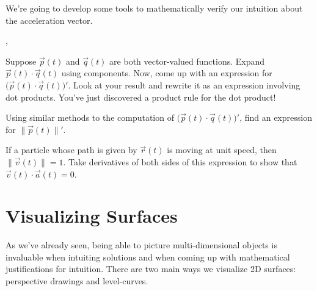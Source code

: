 \documentclass[letter]{article}
\renewcommand{\emph}[1]{{\color{defcolor} \textbf{\textit{##1}}}}
\begin{document}
	We're going to develop some tools to mathematically verify our intuition about the acceleration
	vector.

	\sep
	\vspace{-1cm}
	\begin{Enum}
		\item Suppose $\vec p(t)$ and $\vec q(t)$ are both vector-valued functions.  Expand $\vec p(t)\cdot\vec q(t)$
		using components. Now, come up with an expression for $\Big(\vec p(t)\cdot\vec q(t)\Big)'$.  Look at your
		result and rewrite it as an expression involving dot products.
		You've just discovered a product rule for the dot product!
		\item Using similar methods to the computation of $\Big(\vec p(t)\cdot\vec q(t)\Big)'$, find an expression
			for $\|\vec p(t)\|'$.
		\item If a particle whose path is given by $\vec r(t)$ is moving at unit speed, then $\|\vec v(t)\| = 1$.
			Take derivatives of both sides of this expression to show that $\vec v(t)\cdot \vec a(t) = 0$.
	\end{Enum}

%
%
%


\vspace{-.5cm}
\section*{Visualizing Surfaces}
	As we've already seen, being able to picture multi-dimensional objects is 
	invaluable when intuiting solutions and when coming up with mathematical
	justifications for intuition.  There are two main ways we visualize
	2D surfaces: perspective drawings and level-curves.
\end{document}
